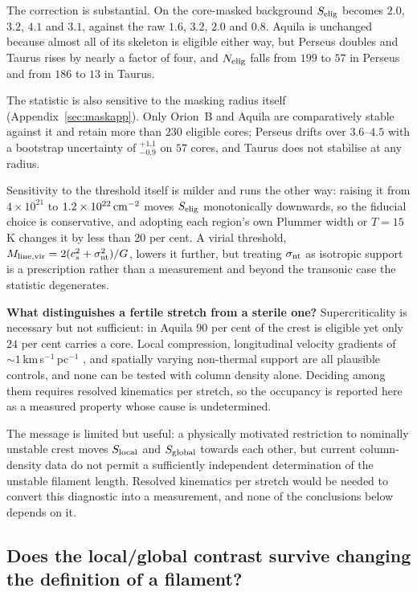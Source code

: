\documentclass[usenatbib,twoside,twocolumn]{mnras}
\begin{document}
The correction is substantial. On the core-masked background $S_{\rm elig}$ becomes $2.0$, $3.2$, $4.1$ and $3.1$, against the raw $1.6$, $3.2$, $2.0$ and $0.8$. Aquila is unchanged because almost all of its skeleton is eligible either way, but Perseus doubles and Taurus rises by nearly a factor of four, and $N_{\rm elig}$ falls from $199$ to $57$ in Perseus and from $186$ to $13$ in Taurus.

The statistic is also sensitive to the masking radius itself (Appendix~\ref{sec:maskapp}). Only Orion~B and Aquila are comparatively stable against it and retain more than $230$ eligible cores; Perseus drifts over $3.6$--$4.5$ with a bootstrap uncertainty of $^{+1.1}_{-0.9}$ on $57$ cores, and Taurus does not stabilise at any radius.



Sensitivity to the threshold itself is milder and runs the other way: raising it from $4\times10^{21}$ to $1.2\times10^{22}\,{\rm cm^{-2}}$ moves $S_{\rm elig}$ monotonically downwards, so the fiducial choice is conservative, and adopting each region's own Plummer width or $T=15$\,K changes it by less than $20$ per cent. A virial threshold, $M_{\rm line,vir}=2(c_s^2+\sigma_{\rm nt}^2)/G$, lowers it further, but treating $\sigma_{\rm nt}$ as isotropic support is a prescription rather than a measurement and beyond the transonic case the statistic degenerates.

\smallskip\noindent\textbf{What distinguishes a fertile stretch from a sterile one?} Supercriticality is necessary but not sufficient: in Aquila $90$ per cent of the crest is eligible yet only $24$ per cent carries a core. Local compression, longitudinal velocity gradients of $\sim1$\,km\,s$^{-1}$\,pc$^{-1}$ \citep{Kirk2013,Hacar2013}, and spatially varying non-thermal support are all plausible controls, and none can be tested with column density alone. Deciding among them requires resolved kinematics per stretch, so the occupancy is reported here as a measured property whose cause is undetermined.

The message is limited but useful: a physically motivated restriction to nominally unstable crest moves $S_{\rm local}$ and $S_{\rm global}$ towards each other, but current column-density data do not permit a sufficiently independent determination of the unstable filament length. Resolved kinematics per stretch would be needed to convert this diagnostic into a measurement, and none of the conclusions below depends on it.

\subsection{Does the local/global contrast survive changing the definition of a filament?}
\label{sec:ontology}
\end{document}
